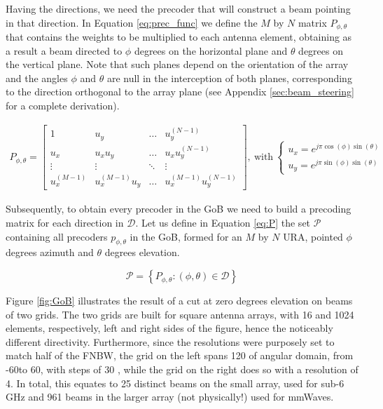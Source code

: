 Having the directions, we need the precoder that will construct a beam pointing in that direction. In Equation \eqref{eq:prec_func} we define the $M$ by $N$ matrix $P_{\phi, \theta}$ that contains the weights to be multiplied to each antenna element, obtaining as a result a beam directed to $\phi$ degrees on the horizontal plane and $\theta$ degrees on the vertical plane. Note that such planes depend on the orientation of the array and the angles $\phi$ and $\theta$ are null in the interception of both planes, corresponding to the direction orthogonal to the array plane (see Appendix \ref{sec:beam_steering} for a complete derivation).


\begin{align} \label{eq:prec_func}
    P_{\phi, \theta}= 
    \begin{bmatrix}
        1 & u_y & \dots & u_y^{(N-1)}\\
        u_x & u_x u_y & \dots & u_x u_y^{(N-1)}\\
        \vdots & \vdots & \ddots & \vdots\\
        u_x^{(M-1)} & u_x^{(M-1)} u_y & \dots & u_x^{(M-1)} u_y^{(N-1)}
    \end{bmatrix}, \ \text{with} \
    \begin{cases}
        u_x = e^{j \pi \cos(\phi)\sin(\theta)} \\
        u_y = e^{j \pi \sin(\phi)\sin(\theta)}   
    \end{cases}
\end{align}


Subsequently, to obtain every precoder in the GoB we need to build a precoding matrix for each direction in $\mathcal{D}$. Let us define in Equation \eqref{eq:P} the set $\mathcal{P}$ containing all precoders $p_{\phi, \theta}$ in the GoB, formed for an $M$ by  $N$ \ac{URA}, pointed $\phi$ degrees azimuth and $\theta$ degrees elevation. 

\begin{equation} \label{eq:P}
    \mathcal{P} = \left\{ P_{\phi, \theta} : (\phi, \theta) \in \mathcal{D}\right\}
\end{equation}

Figure \ref{fig:GoB} illustrates the result of a cut at zero degrees elevation on beams of two grids. The two grids are built for square antenna arrays, with 16 and 1024 elements, respectively, left and right sides of the figure, hence the noticeably different directivity. Furthermore, since the resolutions were purposely set to match half of the \ac{FNBW}, the grid on the left spans 120 \textdegree of angular domain, from -60\textdegree to 60\textdegree, with steps of 30 \textdegree, while the grid on the right does so with a resolution of 4\textdegree. In total, this equates to 25 distinct beams on the small array, used for sub-6 GHz and 961 beams in the larger array (not physically!) used for mmWaves.




